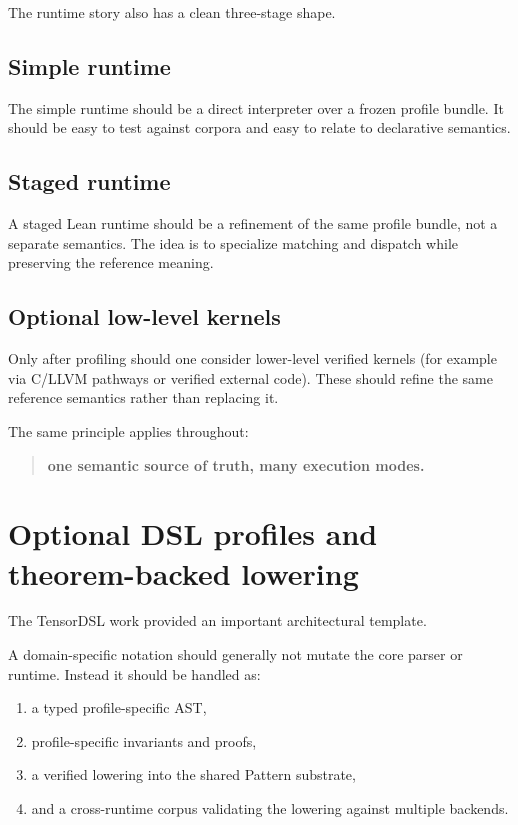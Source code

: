 \documentclass[11pt]{article}
\begin{document}
The runtime story also has a clean three-stage shape.

\subsection{Simple runtime}

The simple runtime should be a direct interpreter over a frozen profile bundle. It should be easy to test against corpora and easy to relate to declarative semantics.

\subsection{Staged runtime}

A staged Lean runtime should be a refinement of the same profile bundle, not a separate semantics. The idea is to specialize matching and dispatch while preserving the reference meaning.

\subsection{Optional low-level kernels}

Only after profiling should one consider lower-level verified kernels (for example via C/LLVM pathways or verified external code). These should refine the same reference semantics rather than replacing it.

The same principle applies throughout:

\begin{quote}
\textbf{one semantic source of truth, many execution modes.}
\end{quote}

\section{Optional DSL profiles and theorem-backed lowering}

The TensorDSL work provided an important architectural template.

A domain-specific notation should generally not mutate the core parser or runtime. Instead it should be handled as:

\begin{enumerate}
  \item a typed profile-specific AST,
  \item profile-specific invariants and proofs,
  \item a verified lowering into the shared Pattern substrate,
  \item and a cross-runtime corpus validating the lowering against multiple backends.
\end{enumerate}
\end{document}

